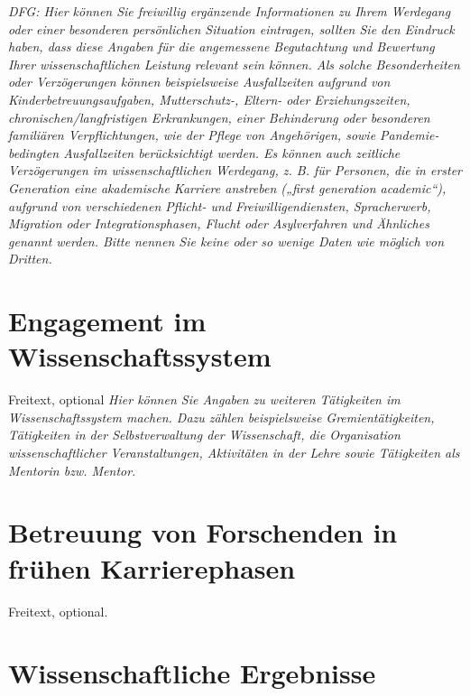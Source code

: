 \documentclass[11pt]{article}
\begin{document}
\emph{DFG: Hier können Sie freiwillig ergänzende Informationen zu
  Ihrem Werdegang oder einer besonderen persönlichen Situation
  eintragen, sollten Sie den Eindruck haben, dass diese Angaben für
  die angemessene Begutachtung und Bewertung Ihrer wissenschaftlichen
  Leistung relevant sein können. Als solche Besonderheiten oder
  Verzögerungen können beispielsweise Ausfallzeiten aufgrund von
  Kinderbetreuungsaufgaben, Mutterschutz-, Eltern- oder
  Erziehungszeiten, chronischen/langfristigen Erkrankungen, einer
  Behinderung oder besonderen familiären Verpflichtungen, wie der
  Pflege von Angehörigen, sowie Pandemie-bedingten Ausfallzeiten
  berücksichtigt werden. Es können auch zeitliche Verzögerungen im
  wissenschaftlichen Werdegang, z. B. für Personen, die in erster
  Generation eine akademische Karriere anstreben („first generation
  academic“), aufgrund von verschiedenen Pflicht- und
  Freiwilligendiensten, Spracherwerb, Migration oder
  Integrationsphasen, Flucht oder Asylverfahren und Ähnliches genannt
  werden. Bitte nennen Sie keine oder so wenige Daten wie möglich von
  Dritten. }

\section*{Engagement im Wissenschaftssystem}%

Freitext, optional
\emph{Hier können Sie Angaben zu weiteren Tätigkeiten im
  Wissenschaftssystem machen. Dazu zählen beispielsweise
  Gremientätigkeiten, Tätigkeiten in der Selbstverwaltung der
  Wissenschaft, die Organisation wissenschaftlicher Veranstaltungen,
  Aktivitäten in der Lehre sowie Tätigkeiten als Mentorin
  bzw. Mentor.}

\section*{Betreuung von Forschenden in frühen Karrierephasen}%

Freitext, optional.

\section*{Wissenschaftliche Ergebnisse}
\end{document}

